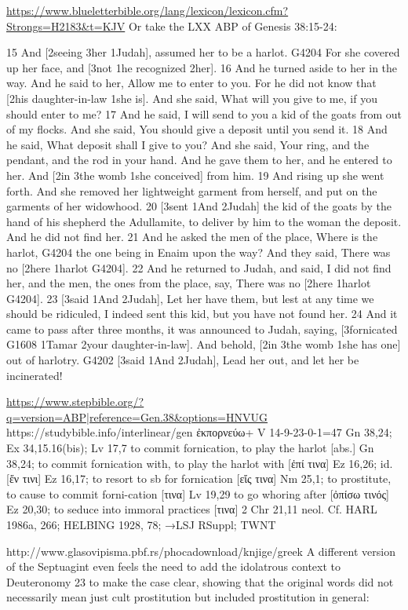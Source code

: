 \documentclass[11pt]{article}
\begin{document}
{\url{https://www.blueletterbible.org/lang/lexicon/lexicon.cfm?Strongs=H2183&t=KJV}
Or take the LXX ABP of Genesis 38:15-24:

15 And [2seeing 3her 1Judah], assumed her to be a harlot. G4204 For she covered up her face, and [3not 1he recognized 2her]. 16 And he turned aside to her in the way. And he said to her, Allow me to enter to you. For he did not know that [2his daughter-in-law 1she is]. And she said, What will you give to me, if you should enter to me? 17 And he said, I will send to you a kid of the goats from out of my flocks. And she said, You should give a deposit until you send it. 18 And he said, What deposit shall I give to you? And she said, Your ring, and the pendant, and the rod in your hand. And he gave them to her, and he entered to her. And [2in 3the womb 1she conceived] from him. 19 And rising up she went forth. And she removed her lightweight garment from herself, and put on the garments of her widowhood. 20 [3sent 1And 2Judah] the kid of the goats by the hand of his shepherd the Adullamite, to deliver by him to the woman the deposit. And he did not find her. 21 And he asked the men of the place, Where is the harlot, G4204 the one being in Enaim upon the way? And they said, There was no [2here 1harlot G4204]. 22 And he returned to Judah, and said, I did not find her, and the men, the ones from the place, say, There was no [2here 1harlot G4204]. 23 [3said 1And 2Judah], Let her have them, but lest at any time we should be ridiculed, I indeed sent this kid, but you have not found her. 24 And it came to pass after three months, it was announced to Judah, saying, [3fornicated G1608 1Tamar 2your daughter-in-law]. And behold, [2in 3the womb 1she has one] out of harlotry. G4202 [3said 1And 2Judah], Lead her out, and let her be incinerated!

\url{https://www.stepbible.org/?q=version=ABP|reference=Gen.38&options=HNVUG}
https://studybible.info/interlinear/gen%
ἐκπορνεύω+
V 14-9-23-0-1=47
Gn 38,24; Ex 34,15.16(bis); Lv 17,7
to commit fornication, to play the harlot [abs.] Gn 38,24; to commit fornication with, to play the harlot
with [ἐπί τινα] Ez 16,26; id. [ἔν τινι] Ez 16,17; to resort to sb for fornication [εἴς τινα] Nm 25,1; to
prostitute, to cause to commit forni-cation [τινα] Lv 19,29
to go whoring after [ὀπίσω τινός] Ez 20,30; to seduce into immoral practices [τινα] 2 Chr 21,11
neol.
Cf. HARL 1986a, 266; HELBING 1928, 78; →LSJ RSuppl; TWNT

http://www.glasovipisma.pbf.rs/phocadownload/knjige/greek%
A different version of the Septuagint even feels the need to add the idolatrous context to Deuteronomy 23 to make the case clear, showing that the original words did not necessarily mean just cult prostitution but included prostitution in general:


}
\end{document}
